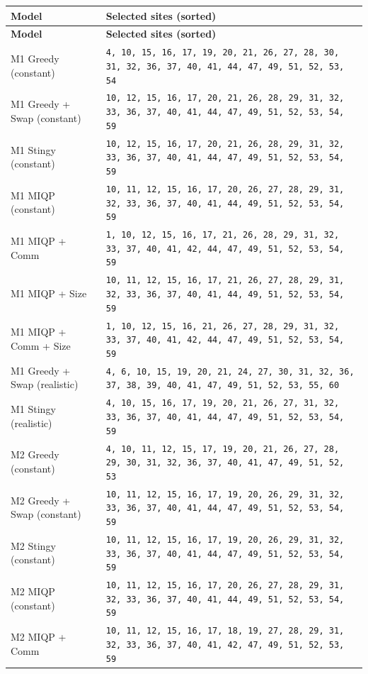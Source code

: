 \documentclass[11pt]{article}
\begin{document}
\begin{longtable}{@{}l p{12cm}@{}}
\toprule
\textbf{Model} & \textbf{Selected sites (sorted)} \\
\midrule
\endfirsthead
\toprule
\textbf{Model} & \textbf{Selected sites (sorted)} \\
\midrule
\endhead
M1 Greedy (constant) & \texttt{4, 10, 15, 16, 17, 19, 20, 21, 26, 27, 28, 30, 31, 32, 36, 37, 40, 41, 44, 47, 49, 51, 52, 53, 54} \\
M1 Greedy + Swap (constant) & \texttt{10, 12, 15, 16, 17, 20, 21, 26, 28, 29, 31, 32, 33, 36, 37, 40, 41, 44, 47, 49, 51, 52, 53, 54, 59} \\
M1 Stingy (constant) & \texttt{10, 12, 15, 16, 17, 20, 21, 26, 28, 29, 31, 32, 33, 36, 37, 40, 41, 44, 47, 49, 51, 52, 53, 54, 59} \\
M1 MIQP (constant) & \texttt{10, 11, 12, 15, 16, 17, 20, 26, 27, 28, 29, 31, 32, 33, 36, 37, 40, 41, 44, 49, 51, 52, 53, 54, 59} \\
M1 MIQP + Comm & \texttt{1, 10, 12, 15, 16, 17, 21, 26, 28, 29, 31, 32, 33, 37, 40, 41, 42, 44, 47, 49, 51, 52, 53, 54, 59} \\
M1 MIQP + Size & \texttt{10, 11, 12, 15, 16, 17, 21, 26, 27, 28, 29, 31, 32, 33, 36, 37, 40, 41, 44, 49, 51, 52, 53, 54, 59} \\
M1 MIQP + Comm + Size & \texttt{1, 10, 12, 15, 16, 21, 26, 27, 28, 29, 31, 32, 33, 37, 40, 41, 42, 44, 47, 49, 51, 52, 53, 54, 59} \\
M1 Greedy + Swap (realistic) & \texttt{4, 6, 10, 15, 19, 20, 21, 24, 27, 30, 31, 32, 36, 37, 38, 39, 40, 41, 47, 49, 51, 52, 53, 55, 60} \\
M1 Stingy (realistic) & \texttt{4, 10, 15, 16, 17, 19, 20, 21, 26, 27, 31, 32, 33, 36, 37, 40, 41, 44, 47, 49, 51, 52, 53, 54, 59} \\
M2 Greedy (constant) & \texttt{4, 10, 11, 12, 15, 17, 19, 20, 21, 26, 27, 28, 29, 30, 31, 32, 36, 37, 40, 41, 47, 49, 51, 52, 53} \\
M2 Greedy + Swap (constant) & \texttt{10, 11, 12, 15, 16, 17, 19, 20, 26, 29, 31, 32, 33, 36, 37, 40, 41, 44, 47, 49, 51, 52, 53, 54, 59} \\
M2 Stingy (constant) & \texttt{10, 11, 12, 15, 16, 17, 19, 20, 26, 29, 31, 32, 33, 36, 37, 40, 41, 44, 47, 49, 51, 52, 53, 54, 59} \\
M2 MIQP (constant) & \texttt{10, 11, 12, 15, 16, 17, 20, 26, 27, 28, 29, 31, 32, 33, 36, 37, 40, 41, 44, 49, 51, 52, 53, 54, 59} \\
M2 MIQP + Comm & \texttt{10, 11, 12, 15, 16, 17, 18, 19, 27, 28, 29, 31, 32, 33, 36, 37, 40, 41, 42, 47, 49, 51, 52, 53, 59} \\

\end{longtable}
\end{document}
